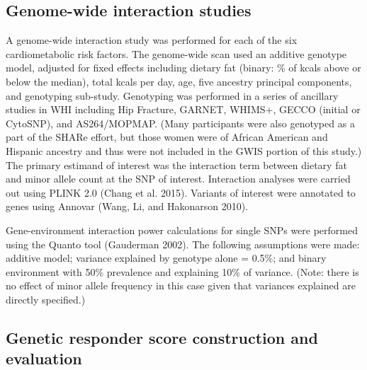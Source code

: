 \documentclass[]{article}
\begin{document}
\hypertarget{genome-wide-interaction-studies}{%
\subsection{Genome-wide interaction
studies}\label{genome-wide-interaction-studies}}

A genome-wide interaction study was performed for each of the six
cardiometabolic risk factors. The genome-wide scan used an additive
genotype model, adjusted for fixed effects including dietary fat
(binary: \% of kcals above or below the median), total kcals per day,
age, five ancestry principal components, and genotyping sub-study.
Genotyping was performed in a series of ancillary studies in WHI
including Hip Fracture, GARNET, WHIMS+, GECCO (initial or CytoSNP), and
AS264/MOPMAP. (Many participants were also genotyped as a part of the
SHARe effort, but those women were of African American and Hispanic
ancestry and thus were not included in the GWIS portion of this study.)
The primary estimand of interest was the interaction term between
dietary fat and minor allele count at the SNP of interest. Interaction
analyses were carried out using PLINK 2.0 (Chang et al. 2015). Variants
of interest were annotated to genes using Annovar (Wang, Li, and
Hakonarson 2010).

Gene-environment interaction power calculations for single SNPs were
performed using the Quanto tool (Gauderman 2002). The following
assumptions were made: additive model; variance explained by genotype
alone = 0.5\%; and binary environment with 50\% prevalence and
explaining 10\% of variance. (Note: there is no effect of minor allele
frequency in this case given that variances explained are directly
specified.)

\hypertarget{genetic-responder-score-construction-and-evaluation}{%
\subsection{Genetic responder score construction and
evaluation}\label{genetic-responder-score-construction-and-evaluation}}
\end{document}
